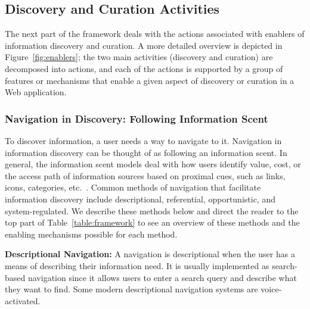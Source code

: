 \documentclass{sigchi}
\newcommand{\feature}[1]{{\ttfamily#1}}
\begin{document}
{\subsection{Discovery and Curation Activities}

The next part of the framework deals with the actions associated with enablers of information discovery and curation. A more detailed overview is depicted in Figure~\ref{fig:enablers}; the two main activities (discovery and curation) are decomposed into actions, and each of the actions is supported by a group of features or mechanisms that enable a given aspect of discovery or curation in a Web application.

{\subsubsection{Navigation in Discovery: Following Information Scent}
To discover information, a user needs a way to navigate to it. Navigation in information discovery can be thought of as following an information scent. In general, the information scent models deal with how users identify value, cost, or the access path of information sources based on proximal cues, such as links, icons, categories, etc.~\cite{pirolli1999information}. Common methods of navigation that facilitate information discovery include descriptional, referential, opportunistic, and system-regulated.  We describe these methods below and direct the reader to the top part of  Table~\ref{table:framework} to see an overview of these methods and the enabling mechanisms possible for each method. 

\textbf{Descriptional Navigation:} A navigation is descriptional when the user has a means of describing their information need. It is usually implemented as \feature{search-based navigation} since it allows users to enter a search query and describe what they want to find.  
Some modern descriptional navigation systems are voice-activated.  
%

}}
\end{document}
